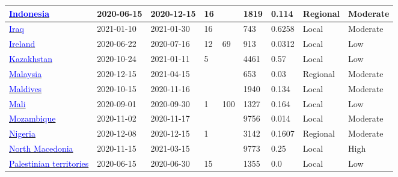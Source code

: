 \begin{table}[ht]
\begin{center}
\begin{tabular}{p{2cm} | p{1.6cm} | p{1.6cm} | p{0.8cm} | p{0.8cm} | p{1cm} | p{1.3cm} | p{1.2cm} | p{1.2cm}}
            \hline 
            \href{https://journals.plos.org/plosone/article?id=10.1371/journal.pone.0251234}{\textcolor{blue}{Indonesia}} & 2020-06-15 & 2020-12-15 & 16 &  & 1819 & 0.114 & Regional & Moderate \\ 
            \hline 
            \href{10.1101/2021.03.23.21254169}{\textcolor{blue}{Iraq}} & 2021-01-10 & 2021-01-30 & 16 &  & 743 & 0.6258 & Local & Moderate \\ 
            \hline 
            \href{https://dx.doi.org/10.2807/1560-7917.ES.2021.26.48.2001741}{\textcolor{blue}{Ireland}} & 2020-06-22 & 2020-07-16 & 12 & 69 & 913 & 0.0312 & Local & Low \\ 
            \hline 
            \href{https://dx.doi.org/10.1002/hsr2.562}{\textcolor{blue}{Kazakhstan}} & 2020-10-24 & 2021-01-11 & 5 &  & 4461 & 0.57 & Local & Low \\ 
            \hline 
            \href{https://dx.doi.org/10.1002/jmv.27441}{\textcolor{blue}{Malaysia}} & 2020-12-15 & 2021-04-15 &  &  & 653 & 0.03 & Regional & Moderate \\ 
            \hline 
            \href{https://apjai-journal.org/wp-content/uploads/2022/01/AP-040721-1177.pdf}{\textcolor{blue}{Maldives}} & 2020-10-15 & 2020-11-16 &  &  & 1940 & 0.134 & Local & Moderate \\ 
            \hline 
            \href{https://doi.org/10.1101/2022.06.03.22275924}{\textcolor{blue}{Mali}} & 2020-09-01 & 2020-09-30 & 1 & 100 & 1327 & 0.164 & Local & Low \\ 
            \hline 
            \href{https://covid19.ins.gov.mz/wp-content/uploads/2020/11/Inqueirito-SE-SARS-CoV-2-de-Cidade-de-Chimoio-Resultados-preliminares-27-Nov-2020-V\_1.1\_corrigido-I\_JANI\_FINAL1.pdf}{\textcolor{blue}{Mozambique}} & 2020-11-02 & 2020-11-17 &  &  & 9756 & 0.014 & Local & Moderate \\ 
            \hline 
            \href{https://www.sciencedirect.com/science/article/pii/S1201971221005968}{\textcolor{blue}{Nigeria}} & 2020-12-08 & 2020-12-15 & 1 &  & 3142 & 0.1607 & Regional & Moderate \\ 
            \hline 
            \href{http://dx.doi.org/10.1111/vox.13117}{\textcolor{blue}{North Macedonia}} & 2020-11-15 & 2021-03-15 &  &  & 9773 & 0.25 & Local & High \\ 
            \hline 
            \href{https://bmjopen.bmj.com/content/11/2/e044552}{\textcolor{blue}{Palestinian territories}} & 2020-06-15 & 2020-06-30 & 15 &  & 1355 & 0.0 & Local & Low \\ 

\end{tabular}
\end{center}
\end{table}
